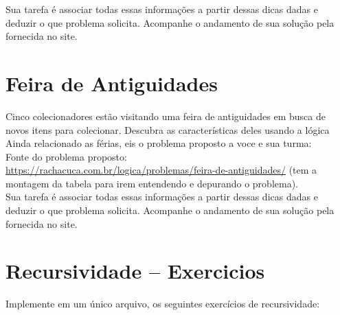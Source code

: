 \documentclass[a4paper,12pt]{article}
\begin{document}
\vspace{1.5cm}
 Sua tarefa é associar todas essas informações a partir dessas dicas dadas e deduzir o que problema solicita. Acompanhe o andamento de sua solução pela fornecida no site.
\newpage
\section{Feira de Antiguidades}

Cinco colecionadores estão visitando uma feira de antiguidades em busca de novos itens para colecionar. 
Descubra as características deles usando a lógica
Ainda relacionado as férias, eis o problema proposto a voce e sua turma:\\
 Fonte do problema proposto:\\
 \url{https://rachacuca.com.br/logica/problemas/feira-de-antiguidades/}
 (tem a montagem da tabela para irem entendendo e depurando o problema).\\


\vspace{1.5cm}
 Sua tarefa é associar todas essas informações a partir dessas dicas dadas e deduzir o que problema solicita. Acompanhe o andamento de sua solução pela fornecida no site.
\newpage
\section{Recursividade -- Exercicios}


Implemente em um único arquivo, os seguintes exercícios
de recursividade:
\end{document}
